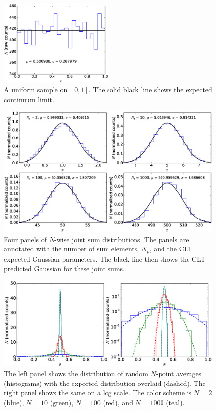 \documentclass[12pt]{article}
\begin{document}
\newpage
\begin{figure}
\centering
\includegraphics[width=0.5\textwidth]{uniform_sample.eps}
\caption{A uniform sample on $[0,1]$. The solid black line shows the expected continuum limit.} \label{fig:uniform}
\end{figure}

\begin{figure}
\centering
\includegraphics[width=1.1\textwidth]{clt.eps}
\caption{Four panels of $N$-wise joint sum distributions.  The panels are annotated with the number of sum elements, $N_p$, and the CLT expected Gaussian parameters.  The black line then shows the CLT predicted Gaussian for these joint sums.} \label{fig:clt}
\end{figure}


\begin{figure}
\centering
\includegraphics[width=1.\textwidth]{clt_average.eps}
\caption{The left panel shows the distribution of random $N$-point averages (histograms) with the expected distribution overlaid (dashed).  The right panel shows the same on a log scale.  The color scheme is $N=2$ (blue), $N=10$ (green), $N=100$ (red), and $N=1000$ (teal).} \label{fig:clt_average}
\end{figure}
\end{document}
